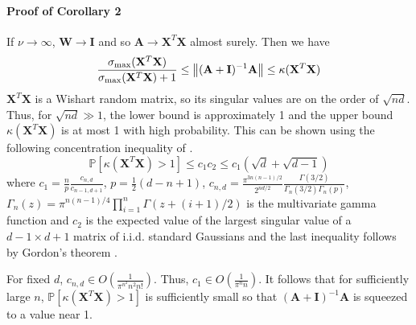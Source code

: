\documentclass[mnsc,blindrev]{informs3}
\begin{document}
        \paragraph{Proof of Corollary 2}
            If $\nu \rightarrow \infty$, $\mathbf{W} \rightarrow \mathbf{I}$ and so $\mathbf{A} \rightarrow \mathbf{X}^T \mathbf{X}$ almost surely. Then we have 
            \begin{equation*}
                \frac{\sigma_{\max}(\mathbf{X}^T \mathbf{X})}{\sigma_{\max}(\mathbf{X}^T \mathbf{X})+1} \leq \norm{(\mathbf{A} + \mathbf{I})^{-1}\mathbf{A}} \leq  \kappa(\mathbf{X}^T \mathbf{X})%
            \end{equation*}
            $\mathbf{X}^T \mathbf{X}$ is a Wishart random matrix, so its singular values are on the order of $\sqrt{nd}$. Thus, for $\sqrt{nd} \gg 1$, the lower bound is approximately 1 and the upper bound $\kappa(\mathbf{X}^T \mathbf{X})$ is at most 1 with high probability.  
            This can be shown using the following concentration inequality of \citep{edelman2005tails}.
            \begin{equation*}
                \mathds{P}[\kappa(\mathbf{X}^T \mathbf{X}) > 1] \leq c_1 c_2 \leq c_1 (\sqrt{d} + \sqrt{d-1})%
            \end{equation*}
            where $c_1 = \frac{n}{p} \frac{c_{n,d}}{c_{n-1,d+1}}$, $p=\frac{1}{2}(d-n+1)$, $c_{n,d} = \frac{\pi^{3n(n-1)/2}}{2^{nd/2}} \frac{\Gamma(3/2)}{\Gamma_n(3/2)\Gamma_n(p)}$, $\Gamma_n(z) = \pi^{n(n-1)/4} \prod_{i=1}^n \Gamma(z + (i+1)/2)$ is the multivariate gamma function and $c_2$ is the expected value of the largest singular value of a $d-1\times d+1$ matrix of i.i.d. standard Gaussians and the last inequality follows by Gordon's theorem \citep{vershynin2012introduction}.
    
            For fixed $d$, $c_{n,d} \in O\left(\frac{1}{\pi^{n^2} n^2 n!}\right)$. Thus, $c_1 \in O\left(\frac{1}{\pi^{n}n}\right)$. It follows that for sufficiently large $n$, $\mathds{P}[\kappa(\mathbf{X}^T \mathbf{X}) > 1]$ is sufficiently small so that $(\mathbf{A} + \mathbf{I})^{-1}\mathbf{A}$ is squeezed to a value near 1. %
    
\end{document}
